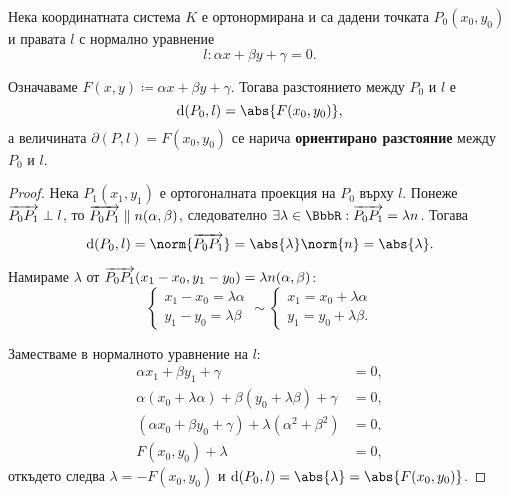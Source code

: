 \documentclass{../../common/topic}
\begin{document}
\begin{theorem}\label{thm:plane_distance}
  Нека координатната система \( K \) е ортонормирана и са дадени точката \( P_0(x_0, y_0) \) и правата \( l \) с нормално уравнение
  \begin{equation*}
    l: \alpha x + \beta y + \gamma = 0.
  \end{equation*}

  Означаваме \( F(x, y) \coloneqq \alpha x + \beta y + \gamma \). Тогава разстоянието между \( P_0 \) и \( l \) е
  \begin{equation*}
    \dist(P_0, l) = \abs{F(x_0, y_0)},
  \end{equation*}
  а величината \( \partial(P, l) = F(x_0, y_0) \) се нарича \textbf{ориентирано разстояние} между \( P_0 \) и \( l \).
\end{theorem}
\begin{proof}
  Нека \( P_1(x_1, y_1) \) е ортогоналната проекция на \( P_0 \) върху \( l \). Понеже \( \overrightarrow{P_0 P_1} \perp l \), то \( \overrightarrow{P_0 P_1} \parallel n(\alpha, \beta) \), следователно \( \exists \lambda \in \BbbR: \vect{P_0 P_1} = \lambda n \). Тогава
  \begin{equation*}
    \dist(P_0, l)
    =
    \norm{\vect{P_0 P_1}}
    =
    \abs{\lambda} \norm{n}
    =
    \abs{\lambda}.
  \end{equation*}

  Намираме \( \lambda \) от \( \overrightarrow{P_0 P_1}(x_1 - x_0, y_1 - y_0) = \lambda n(\alpha, \beta) \):
  \begin{equation*}
    \begin{cases}
      x_1 - x_0 = \lambda \alpha \\
      y_1 - y_0 = \lambda \beta
    \end{cases}
    \sim
    \begin{cases}
      x_1 = x_0 + \lambda \alpha \\
      y_1 = y_0 + \lambda \beta.
    \end{cases}
  \end{equation*}

  Заместваме в нормалното уравнение на \( l \):
  \begin{align*}
    \alpha x_1 + \beta y_1 + \gamma &= 0,
    \\
    \alpha (x_0 + \lambda \alpha) + \beta (y_0 + \lambda \beta) + \gamma &= 0,
    \\
    (\alpha x_0 + \beta y_0 + \gamma) + \lambda(\alpha^2 + \beta^2) &= 0,
    \\
    F(x_0, y_0) + \lambda &= 0,
  \end{align*}
  откъдето следва \( \lambda = -F(x_0, y_0) \) и \( \dist(P_0, l) = \abs{\lambda} = \abs{F(x_0, y_0)} \).
\end{proof}
\end{document}
